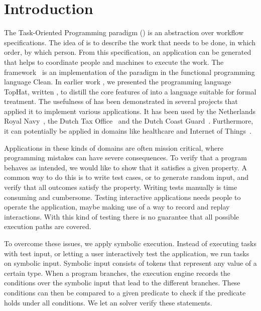 
\section{Introduction}

The Task-Oriented Programming paradigm (\TOP) is an abstraction over workflow specifications.
The idea of \TOP is to describe the work that needs to be done, in which order, by which person.
From this specification, an application can be generated that helps to coordinate people and machines to execute the work.
The \ITASKS framework~\cite{DBLP:conf/ppdp/PlasmeijerLMAK12} is an implementation of the paradigm in the functional programming language Clean.
In earlier work \cite{DBLP:conf/ppdp/SteenvoordenNK19}, we presented the programming language TopHat, written \TOPHAT, to distill the core features of \TOP into a language suitable for formal treatment.
%
The usefulness of \TOP has been demonstrated in several projects that applied it to implement various applications.
It has been used by the Netherlands Royal Navy~\cite{jansen2018dynamic}, the Dutch Tax Office~\cite{conf/sfp/StutterheimAP17} and the Dutch Coast Guard~\cite{lijnse2012incidone}. %
Furthermore, it can potentially be applied in domains like healthcare and Internet of Things~\cite{DBLP:conf/cgo/KoopmanLP18}.

Applications in these kinds of domains are often mission critical, where programming mistakes can have severe consequences.
To verify that a \TOPHAT program behaves as intended, we would like to show that it satisfies a given property.
A common way to do this is to write test cases, or to generate random input, and verify that all outcomes satisfy the property.
Writing tests manually is time consuming and cumbersome.
Testing interactive applications needs people to operate the application, maybe making use of a way to record and replay interactions.
With this kind of testing there is no guarantee that all possible execution paths are covered.

To overcome these issues, we apply symbolic execution.
Instead of executing tasks with test input, or letting a user interactively test the application,
we run tasks on symbolic input.
Symbolic input consists of tokens that represent any value of a certain type.
When a program branches, the execution engine records the conditions over the symbolic input that lead to the different branches.
These conditions can then be compared to a given predicate to check if the predicate holds under all conditions.
We let an \SMT solver verify these statements.

